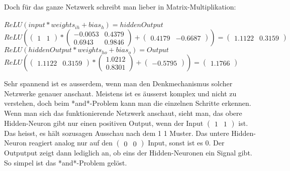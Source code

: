 \documentclass[10pt,a4paper,ngerman,english]{article}
\begin{document}
Doch für das ganze Netzwerk schreibt man lieber in Matrix-Multiplikation:\\
\\
$ ReLU(input * weights_{ih} + bias_h) = hiddenOutput $\\
$
ReLU(
\left(\begin{array}{cc} 1 & 1\end{array}\right) * 
\left(\begin{array}{cc} -0.0053 & 0.4379\\ 0.6943 & 0.9846\end{array}\right) + 
\left(\begin{array}{cc} 0.4179 & -0.6687\end{array}\right)) = 
\left(\begin{array}{cc} 1.1122 & 0.3159\end{array}\right)
$\\
$ ReLU(hiddenOutput * weights_{ho} + bias_o) = Output $\\
$
ReLU(
\left(\begin{array}{cc} 1.1122 & 0.3159\end{array}\right) * 
\left(\begin{array}{cc} 1.0212\\ 0.8301\end{array}\right) + 
\left(\begin{array}{cc} -0.5795\end{array}\right)) 
= \left(\begin{array}{cc}  1.1766\end{array}\right)
$

Sehr spannend ist es ausserdem, wenn man den Denkmechanismus solcher Netzwerke genauer anschaut. Meistens ist es äusserst komplex und nicht zu verstehen, doch beim *and*-Problem kann man die einzelnen Schritte erkennen. Wenn man sich das funktionierende Netzwerk anschaut, sieht man, das obere Hidden-Neuron gibt nur einen positiven Output, wenn der Input $ \left(\begin{array}{cc} 1 & 1\end{array}\right) $ ist. Das heisst, es hält sozusagen Ausschau nach dem 1 1 Muster. Das untere Hidden-Neuron reagiert analog nur auf den $ \left(\begin{array}{cc} 0 & 0\end{array}\right) $ Input, sonst ist es 0. Der Outputput zeigt dann lediglich an, ob eins der Hidden-Neuronen ein Signal gibt. So simpel ist das *and*-Problem gelöst.
\end{document}
